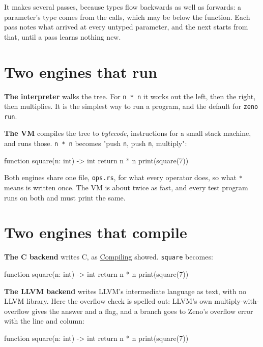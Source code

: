 It makes several passes, because types flow backwards as well as
forwards: a parameter's type comes from the calls, which may be below
the function. Each pass notes what arrived at every untyped parameter,
and the next starts from that, until a pass learns nothing new.

\section{Two engines that run}

\textbf{The interpreter} walks the tree. For \verb|n * n| it works out
the left, then the right, then multiplies. It is the simplest way to
run a program, and the default for \verb|zeno run|.

\textbf{The VM} compiles the tree to \emph{bytecode}, instructions for
a small stack machine, and runs those. \verb|n * n| becomes "push
\verb|n|, push \verb|n|, multiply":

\begin{zeno}[file=square.zeno, dir=sq, show=no, cmd=zeno bytecode {file}]
function square(n: int) -> int {
    return n * n
}
print(square(7))
\end{zeno}

Both engines share one file, \verb|ops.rs|, for what every operator
does, so what \verb|*| means is written once. The VM is about twice as
fast, and every test program runs on both and must print the same.

\section{Two engines that compile}

\textbf{The C backend} writes C, as \hyperref[ch-compiling]{Compiling}
showed. \verb|square| becomes:

\begin{zeno}[file=square.zeno, dir=sq, show=no, cmd=zeno build {file} > /dev/null ;; grep -A3 "^static int64_t z_square(int64_t z_n) {" square.c]
function square(n: int) -> int {
    return n * n
}
print(square(7))
\end{zeno}

\textbf{The LLVM backend} writes LLVM's intermediate language as text,
with no LLVM library. Here the overflow check is spelled out: LLVM's
own multiply-with-overflow gives the answer and a flag, and a branch
goes to Zeno's overflow error with the line and column:

\begin{zeno}[file=square.zeno, dir=sq, show=no, cmd=zeno build --llvm {file} > /dev/null ;; grep -A13 "define internal i64 @z_square" square.ll]
function square(n: int) -> int {
    return n * n
}
print(square(7))
\end{zeno}

